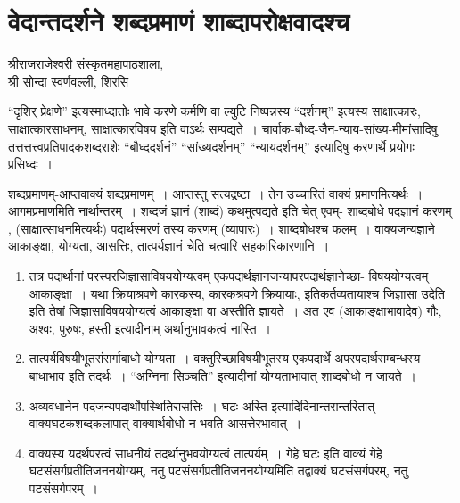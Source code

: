 {\fontsize{15}{17}\selectfont
\chapter{वेदान्तदर्शने शब्दप्रमाणं शाब्दापरोक्षवादश्च}

\begin{center}
\smallskip
 
श्रीराजराजेश्वरी संस्कृतमहापाठशाला,\\
श्री सोन्दा स्वर्णवल्ली, शिरसि
\addrule
\end{center}

“दृशिर् प्रेक्षणे” इत्यस्माध्दातोः भावे करणे कर्मणि वा ल्युटि निष्पन्नस्य “दर्शनम्” इत्यस्य साक्षात्कारः, साक्षात्कारसाधनम्, साक्षात्कारविषय इति वाऽर्थः सम्पद्यते~। चार्वाक-बौध्द-जैन-न्याय-सांख्य-मीमांसादिषु तत्तत्तत्त्वप्रतिपादकशब्दराशेः “बौध्ददर्शनं” “सांख्यदर्शनम्” “न्यायदर्शनम्”  इत्यादिषु करणार्थे प्रयोगः प्रसिध्दः~। 

शब्दप्रमाणम्-आप्तवाक्यं शब्दप्रमाणम्~। आप्तस्तु सत्यद्रष्टा~। तेन उच्चारितं वाक्यं प्रमाणमित्यर्थः~। आगमप्रमाणमिति नार्थान्तरम्~। शब्दजं ज्ञानं (शाब्दं) कथमुत्पद्यते इति चेत् एवम्- शाब्दबोधे पदज्ञानं करणम् , (साक्षात्साधनमित्यर्थः) पदार्थस्मरणं तस्य करणम् (व्यापारः)~।  शाब्दबोधश्च फलम्~। वाक्यजन्यज्ञाने आकाङ्क्षा, योग्यता, आसत्तिः, तात्पर्यज्ञानं चेति चत्वारि सहकारिकारणानि~। 

\begin{enumerate}
\item तत्र पदार्थानां परस्परजिज्ञासाविषययोग्यत्वम् एकपदार्थज्ञानजन्यापरपदार्थज्ञानेच्छा- विषययोग्यत्वम् आकाङ्क्षा~। यथा क्रियाश्रवणे कारकस्य, कारकश्रवणे क्रियायाः, इतिकर्तव्यतायाश्च जिज्ञासा उदेति इति तेषां जिज्ञासाविषययोग्यत्वं आकाङ्क्षा वा अस्तीति ज्ञायते~। अत एव (आकाङ्क्षाभावादेव) गौः, अश्वः, पुरुषः, हस्ती इत्यादीनाम् अर्थानुभावकत्वं नास्ति~। 
\item तात्पर्यविषयीभूतसंसर्गाबाधो योग्यता~। वक्तुरिच्छाविषयीभूतस्य एकपदार्थे अपरपदार्थसम्बन्धस्य बाधाभाव इति तदर्थः~। “अग्निना सिञ्चति” इत्यादीनां योग्यताभावात् शाब्दबोधो न जायते~। 
\item अव्यवधानेन पदजन्यपदार्थोपस्थितिरासत्तिः~। घटः अस्ति इत्यादिदिनान्तरान्तरितात् वाक्यघटकशब्दकलापात् वाक्यार्थबोधो न भवति आसत्तेरभावात्~। 
\item वाक्यस्य यदर्थपरत्वं साधनीयं तदर्थानुभवयोग्यत्वं  तात्पर्यम्~। गेहे घटः इति वाक्यं गेहे घटसंसर्गप्रतीतिजननयोग्यम्, नतु पटसंसर्गप्रतीतिजननयोग्यमिति तद्वाक्यं घटसंसर्गपरम्, नतु पटसंसर्गपरम्~। 
\end{enumerate}

}
